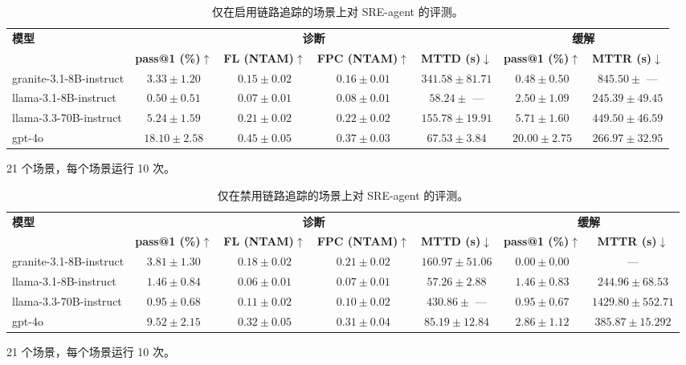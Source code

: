 \documentclass[10pt,UTF8,fontset=fandol]{ctexart}
\begin{document}
\begin{table}[H]
\centering
\caption{仅在启用链路追踪的场景上对 SRE-agent 的评测。}
\label{tab:itb-tab19}
\begin{adjustbox}{max width=\linewidth}
\begin{tabular}{lcccccc}
\toprule
\multirow{2}{*}{\textbf{模型}} & \multicolumn{4}{c}{\textbf{诊断}} & \multicolumn{2}{c}{\textbf{缓解}} \\
\cmidrule(lr){2-5}\cmidrule(lr){6-7}
 & \textbf{pass@1 (\%)$\uparrow$} & \textbf{FL (NTAM)$\uparrow$} & \textbf{FPC (NTAM)$\uparrow$} & \textbf{MTTD (s)$\downarrow$} & \textbf{pass@1 (\%)$\uparrow$} & \textbf{MTTR (s)$\downarrow$} \\
\midrule
granite-3.1-8B-instruct & $3.33 \pm 1.20$ & $0.15 \pm 0.02$ & $0.16 \pm 0.01$ & $341.58 \pm 81.71$ & $0.48 \pm 0.50$ & $845.50\pm$ — \\
llama-3.1-8B-instruct & $0.50 \pm 0.51$ & $0.07 \pm 0.01$ & $0.08 \pm 0.01$ & $58.24\pm$ — & $2.50 \pm 1.09$ & $245.39 \pm 49.45$ \\
llama-3.3-70B-instruct & $5.24 \pm 1.59$ & $0.21 \pm 0.02$ & $0.22 \pm 0.02$ & $155.78 \pm 19.91$ & $5.71 \pm 1.60$ & $449.50 \pm 46.59$ \\
gpt-4o & $18.10 \pm 2.58$ & $0.45 \pm 0.05$ & $0.37 \pm 0.03$ & $67.53 \pm 3.84$ & $20.00 \pm 2.75$ & $266.97 \pm 32.95$ \\
\bottomrule
\end{tabular}
\end{adjustbox}

\footnotesize 21 个场景，每个场景运行 10 次。
\end{table}

\begin{table}[H]
\centering
\caption{仅在禁用链路追踪的场景上对 SRE-agent 的评测。}
\label{tab:itb-tab20}
\begin{adjustbox}{max width=\linewidth}
\begin{tabular}{lcccccc}
\toprule
\multirow{2}{*}{\textbf{模型}} & \multicolumn{4}{c}{\textbf{诊断}} & \multicolumn{2}{c}{\textbf{缓解}} \\
\cmidrule(lr){2-5}\cmidrule(lr){6-7}
 & \textbf{pass@1 (\%)$\uparrow$} & \textbf{FL (NTAM)$\uparrow$} & \textbf{FPC (NTAM)$\uparrow$} & \textbf{MTTD (s)$\downarrow$} & \textbf{pass@1 (\%)$\uparrow$} & \textbf{MTTR (s)$\downarrow$} \\
\midrule
granite-3.1-8B-instruct & $3.81 \pm 1.30$ & $0.18 \pm 0.02$ & $0.21 \pm 0.02$ & $160.97 \pm 51.06$ & $0.00 \pm 0.00$ & — \\
llama-3.1-8B-instruct & $1.46 \pm 0.84$ & $0.06 \pm 0.01$ & $0.07 \pm 0.01$ & $57.26 \pm 2.88$ & $1.46 \pm 0.83$ & $244.96 \pm 68.53$ \\
llama-3.3-70B-instruct & $0.95 \pm 0.68$ & $0.11 \pm 0.02$ & $0.10 \pm 0.02$ & $430.86\pm$ — & $0.95 \pm 0.67$ & $1429.80 \pm 552.71$ \\
gpt-4o & $9.52 \pm 2.15$ & $0.32 \pm 0.05$ & $0.31 \pm 0.04$ & $85.19 \pm 12.84$ & $2.86 \pm 1.12$ & $385.87 \pm 15.292$ \\
\bottomrule
\end{tabular}
\end{adjustbox}

\footnotesize 21 个场景，每个场景运行 10 次。
\end{table}
\end{document}
